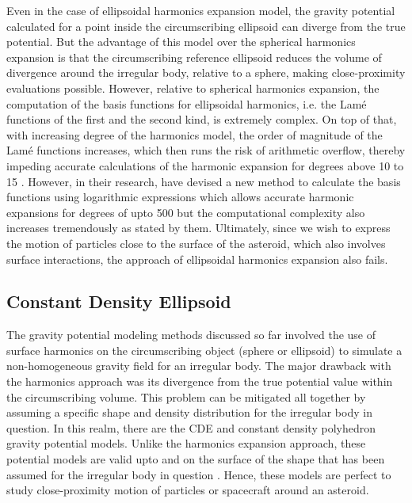 %
\newline\newline
%
Even in the case of ellipsoidal harmonics expansion model, the gravity potential calculated for a point inside the circumscribing ellipsoid can diverge from the true potential. But the advantage of this model over the spherical harmonics expansion is that the circumscribing reference ellipsoid reduces the volume of divergence around the irregular body, relative to a sphere, making close-proximity evaluations possible. However, relative to spherical harmonics expansion, the computation of the basis functions for ellipsoidal harmonics, i.e. the Lam\'e functions of the first and the second kind, is extremely complex. On top of that, with increasing degree of the harmonics model, the order of magnitude of the Lam\'e functions increases, which then runs the risk of arithmetic overflow, thereby impeding accurate calculations of the harmonic expansion for degrees above 10 to 15 \parencite{reimond2016spheroidal}. However, in their research, \cite{reimond2016spheroidal} have devised a new method to calculate the basis functions using logarithmic expressions which allows accurate harmonic expansions for degrees of upto 500 but the computational complexity also increases tremendously as stated by them. Ultimately, since we wish to express the motion of particles close to the surface of the asteroid, which also involves surface interactions, the approach of ellipsoidal harmonics expansion also fails.

\subsection{Constant Density Ellipsoid}
\label{subsec:constant_density_ellipsoid}
The gravity potential modeling methods discussed so far involved the use of surface harmonics on the circumscribing object (sphere or ellipsoid) to simulate a non-homogeneous gravity field for an irregular body. The major drawback with the harmonics approach was its divergence from the true potential value within the circumscribing volume. This problem can be mitigated all together by assuming a specific shape and density distribution for the irregular body in question. In this realm, there are the \gls{CDE} and constant density polyhedron gravity potential models. Unlike the harmonics expansion approach, these potential models are valid upto and on the surface of the shape that has been assumed for the irregular body in question \parencite{scheeresBook}. Hence, these models are perfect to study close-proximity motion of particles or spacecraft around an asteroid.


